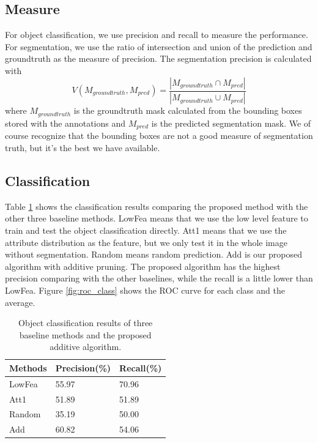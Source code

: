 \documentclass[10pt,twocolumn,letterpaper]{article}
\begin{document}
\subsection{Measure}
\label{ssec:measure}

For object classification, we use precision and recall to measure the performance. 
For segmentation, we use the ratio of intersection and union of the prediction and 
groundtruth as the measure of precision. The segmentation
precision is calculated with
\[ V(M_{groundtruth},M_{pred}) = \frac{|M_{groundtruth} \cap M_{pred}|}{|M_{groundtruth} \cup M_{pred}|} \]
where $M_{groundtruth}$ is the groundtruth mask calculated from the
bounding boxes stored with the annotations and $M_{pred}$ is the
predicted segmentation mask.  We of course recognize that the
bounding boxes are not a good measure of segmentation truth, but
it's the best we have available.\\

\subsection{Classification}
\label{ssec:classification}

Table \ref{table:aresults} shows the classification results comparing the proposed method with 
the other three baseline methods. LowFea means that we use the low level feature to train and test 
the object classification directly. Att1 means that we use the attribute distribution as the feature,
but we only test it in the whole image without segmentation. Random means random prediction. Add is our
proposed algorithm with additive pruning. The proposed algorithm has the highest precision comparing 
with the other baselines, while the recall is a little lower than LowFea. Figure \ref{fig:roc_class} 
shows the ROC curve for each class and the average.\\


\begin{table}
\centering
\begin{tabular}{|l|l|l|}
\hline Methods & Precision(\%) & Recall(\%) \\
\hline LowFea  & 55.97 & 70.96 \\
\hline Att1    & 51.89 & 51.89 \\
\hline Random  & 35.19 & 50.00 \\
\hline Add     & 60.82 & 54.06 \\
\hline
\end{tabular}
\caption{Object classification results of three baseline methods and the proposed additive algorithm.}
\label{table:aresults}
\end{table}
\end{document}
